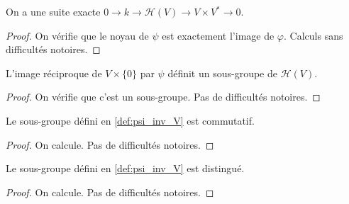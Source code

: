 \begin{proposition}
    \label{exact_seq_h}
    \leanok 

    On a une suite exacte $0\rightarrow k \rightarrow \mathcal{H}(V) \rightarrow
    V\times V^* \rightarrow 0$.
    \begin{proof}
        \leanok
        On vérifie que le noyau de $\psi$ est exactement l'image de $\varphi$. Calculs sans difficultés notoires.
    \end{proof}
\end{proposition}

\begin{definition}[$\psi^{-1}(V)$]
    \label{def:psi_inv_V}
    \leanok 

    L'image réciproque de $V\times\{0\}$ par $\psi$ définit un sous-groupe de $\mathcal{H}(V)$.
    \begin{proof}
        \leanok
        On vérifie que c'est un sous-groupe. Pas de difficultés notoires.
    \end{proof}
\end{definition}

\begin{proposition}
    \label{prop:psi_inv_V_comm}
    \leanok

    Le sous-groupe défini en \ref{def:psi_inv_V} est commutatif.
    \begin{proof}
        \leanok
        On calcule. Pas de difficultés notoires.
    \end{proof}
\end{proposition}

\begin{proposition}
    \label{prop:psi_inv_V_normal}
    \leanok

    Le sous-groupe défini en \ref{def:psi_inv_V} est distingué.
    \begin{proof}
        \leanok 
        On calcule. Pas de difficultés notoires.
    \end{proof}
\end{proposition}

